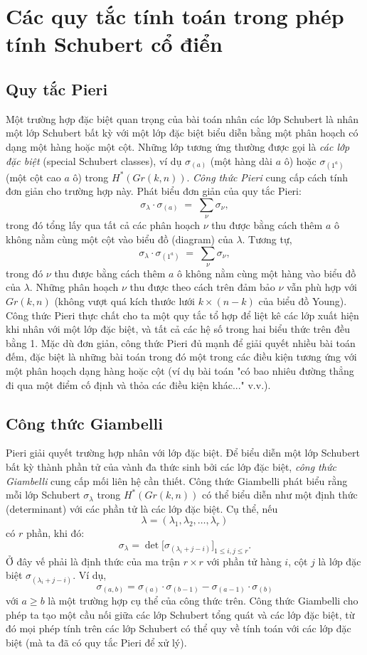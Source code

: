 \section{Các quy tắc tính toán trong phép tính Schubert cổ điển}

\subsection{Quy tắc Pieri}
Một trường hợp đặc biệt quan trọng của bài toán nhân các lớp Schubert là nhân một lớp Schubert bất kỳ với một lớp đặc biệt biểu diễn bằng một phân hoạch có dạng một hàng hoặc một cột. Những lớp tương ứng thường được gọi là \textit{các lớp đặc biệt} (special Schubert classes), ví dụ $\sigma_{(a)}$ (một hàng dài $a$ ô) hoặc $\sigma_{(1^a)}$ (một cột cao $a$ ô) trong $H^*(Gr(k,n))$. \textit{Công thức Pieri} cung cấp cách tính đơn giản cho trường hợp này. Phát biểu đơn giản của quy tắc Pieri:
\[ \sigma_{\lambda} \cdot \sigma_{(a)} \;=\; \sum_{\nu} \sigma_{\nu}, \]
trong đó tổng lấy qua tất cả các phân hoạch $\nu$ thu được bằng cách thêm $a$ ô không nằm cùng một cột vào biểu đồ (diagram) của $\lambda$. Tương tự,
\[ \sigma_{\lambda} \cdot \sigma_{(1^a)} \;=\; \sum_{\nu} \sigma_{\nu}, \]
trong đó $\nu$ thu được bằng cách thêm $a$ ô không nằm cùng một hàng vào biểu đồ của $\lambda$. Những phân hoạch $\nu$ thu được theo cách trên đảm bảo $\nu$ vẫn phù hợp với $Gr(k,n)$ (không vượt quá kích thước lưới $k \times (n-k)$ của biểu đồ Young). Công thức Pieri thực chất cho ta một quy tắc tổ hợp để liệt kê các lớp xuất hiện khi nhân với một lớp đặc biệt, và tất cả các hệ số trong hai biểu thức trên đều bằng 1. Mặc dù đơn giản, công thức Pieri đủ mạnh để giải quyết nhiều bài toán đếm, đặc biệt là những bài toán trong đó một trong các điều kiện tương ứng với một phân hoạch dạng hàng hoặc cột (ví dụ bài toán "có bao nhiêu đường thẳng đi qua một điểm cố định và thỏa các điều kiện khác..." v.v.).

\subsection{Công thức Giambelli}
Pieri giải quyết trường hợp nhân với lớp đặc biệt. Để biểu diễn một lớp Schubert bất kỳ thành phần tử của vành đa thức sinh bởi các lớp đặc biệt, \textit{công thức Giambelli} cung cấp mối liên hệ cần thiết. Công thức Giambelli phát biểu rằng mỗi lớp Schubert $\sigma_{\lambda}$ trong $H^*(Gr(k,n))$ có thể biểu diễn như một định thức (determinant) với các phần tử là các lớp đặc biệt. Cụ thể, nếu 
$$\lambda = (\lambda_1,\lambda_2,\dots,\lambda_r)$$ 
có $r$ phần, khi đó:
$$ \sigma_{\lambda} = \det\big[\sigma_{(\lambda_i + j - i)}\big]_{1 \le i,j \le r}.
$$
Ở đây vế phải là định thức của ma trận $r \times r$ với phần tử hàng $i$, cột $j$ là lớp đặc biệt $\sigma_{(\lambda_i + j - i)}$. Ví dụ, 
$$\sigma_{(a,b)} = \sigma_{(a)}\cdot \sigma_{(b-1)} - \sigma_{(a-1)}\cdot \sigma_{(b)}$$ 
với $a \ge b$ là một trường hợp cụ thể của công thức trên. Công thức Giambelli cho phép ta tạo một cầu nối giữa các lớp Schubert tổng quát và các lớp đặc biệt, từ đó mọi phép tính trên các lớp Schubert có thể quy về tính toán với các lớp đặc biệt (mà ta đã có quy tắc Pieri để xử lý).


